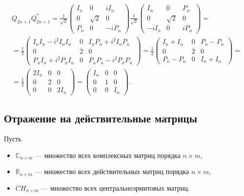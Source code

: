 \begin{multline*}
    Q_{2n+1} Q_{2n+1}^*
    = \frac{1}{\sqrt{2}}
    \begin{pmatrix}
        I_n & 0        & i I_n   \\
        0   & \sqrt{2} & 0       \\
        P_n & 0        & - i P_n
    \end{pmatrix}
    \frac{1}{\sqrt{2}}
    \begin{pmatrix}
        I_n    & 0        & P_n   \\
        0      & \sqrt{2} & 0     \\
        -i I_n & 0        & i P_n
    \end{pmatrix} = \\
    = \frac{1}{2}
    \begin{pmatrix}
        I_n I_n - i^2 I_n I_n & 0 & I_n P_n + i^2 I_n P_n \\
        0                     & 2 & 0                     \\
        P_n I_n + i^2 P_n I_n & 0 & P_n P_n - i^2 P_n P_n
    \end{pmatrix}
    = \frac{1}{2}
    \begin{pmatrix}
        I_n + I_n & 0 & P_n - P_n \\
        0         & 2 & 0         \\
        P_n - P_n & 0 & I_n + I_n
    \end{pmatrix} = \\
    = \frac{1}{2}
    \begin{pmatrix}
        2 I_n & 0 & 0     \\
        0     & 2 & 0     \\
        0     & 0 & 2 I_n
    \end{pmatrix}
    = \begin{pmatrix}
        I_n & 0 & 0   \\
        0   & 1 & 0   \\
        0   & 0 & I_n
    \end{pmatrix} .
\end{multline*}


\subsection{Отражение на действительные матрицы}

Пусть
\begin{itemize}
    \item[] $\mathbb{C}_{n \times m}$ --- множество всех комплексных матриц порядка $n \times m$,
    \item[] $\mathbb{R}_{n \times m}$ --- множество всех действительных матриц порядка $n \times m$,
    \item[] $CH_{n \times m}$ --- множество всех центральноэрмитовых матриц.
\end{itemize}

